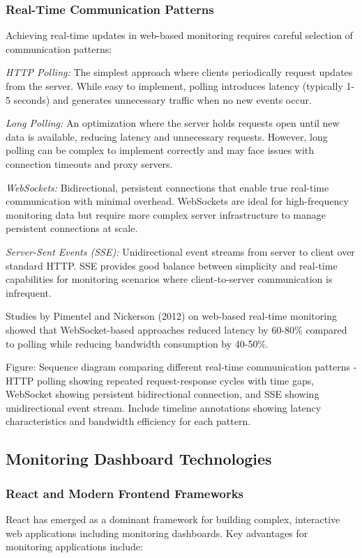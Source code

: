 \subsubsection{Real-Time Communication Patterns}
Achieving real-time updates in web-based monitoring requires careful selection of communication patterns:

\textit{HTTP Polling:} The simplest approach where clients periodically request updates from the server. While easy to implement, polling introduces latency (typically 1-5 seconds) and generates unnecessary traffic when no new events occur.

\textit{Long Polling:} An optimization where the server holds requests open until new data is available, reducing latency and unnecessary requests. However, long polling can be complex to implement correctly and may face issues with connection timeouts and proxy servers.

\textit{WebSockets:} Bidirectional, persistent connections that enable true real-time communication with minimal overhead. WebSockets are ideal for high-frequency monitoring data but require more complex server infrastructure to manage persistent connections at scale.

\textit{Server-Sent Events (SSE):} Unidirectional event streams from server to client over standard HTTP. SSE provides good balance between simplicity and real-time capabilities for monitoring scenarios where client-to-server communication is infrequent.

Studies by Pimentel and Nickerson (2012) on web-based real-time monitoring showed that WebSocket-based approaches reduced latency by 60-80\% compared to polling while reducing bandwidth consumption by 40-50\%.

{{Figure: Sequence diagram comparing different real-time communication patterns - HTTP polling showing repeated request-response cycles with time gaps, WebSocket showing persistent bidirectional connection, and SSE showing unidirectional event stream. Include timeline annotations showing latency characteristics and bandwidth efficiency for each pattern.}}

\subsection{Monitoring Dashboard Technologies}

\subsubsection{React and Modern Frontend Frameworks}
React has emerged as a dominant framework for building complex, interactive web applications including monitoring dashboards. Key advantages for monitoring applications include:

